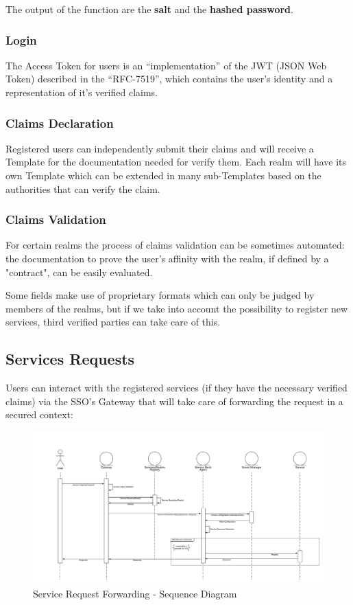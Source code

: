 \documentclass{article}
\begin{document}
The output of the function are the \textbf{salt} and the \textbf{hashed password}.

\subsubsection{Login}
The Access Token for users is an ``implementation''\cite{jwt.io} of the JWT (JSON Web Token) described in the ``RFC-7519''\cite{JWT}, which contains the user's identity and a representation of it's verified claims.

\subsubsection{Claims Declaration}
Registered users can independently submit their claims and will receive a Template for the  documentation needed for verify them. Each realm will have its own Template which can be extended in many sub-Templates based on the authorities that can verify the claim.

\subsubsection{Claims Validation}
For certain realms the process of claims validation can be sometimes automated: the documentation to prove the user's affinity with the realm, if defined by a "contract", can be easily evaluated. 

Some fields make use of proprietary formats which can only be judged by members of the realms, but if we take into account the possibility to register new services, third verified parties can take care of this.

\newpage

\subsection{Services Requests}
Users can interact with the registered services (if they have the necessary verified claims) via the SSO's Gateway that will take care of forwarding the request in a secured context:
\begin{figure}[h]
    \centering
    \includegraphics[scale=0.27]{Service_Request_Forwarding-Sequence_Diagram.jpeg}
    \caption{Service Request Forwarding - Sequence Diagram}
    \label{fig:Service_Request_Forwarding}
\end{figure}{}
\end{document}
